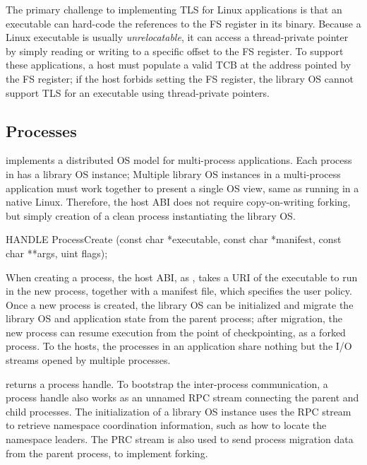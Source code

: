 The primary challenge
to implementing TLS for Linux applications
is that an executable can hard-code the references to the FS register in its binary.
Because a Linux executable is usually {\em unrelocatable},
it can access a thread-private pointer by simply reading or writing to a specific offset
to the FS register.
To support these applications,
a host must populate a valid TCB at the address pointed by the FS register;
if the host forbids setting the FS register,
the library OS cannot support TLS for an executable using thread-private pointers.




\subsection{Processes}
\label{sec:abi:proc}


\graphene{} implements a distributed OS model for multi-process applications.
Each process in \graphene{} has a library OS instance;
Multiple library OS instances in a multi-process application must work together
to present a single OS view,
same as running in a native Linux.
Therefore, the host ABI does not require copy-on-writing forking,
but simply creation of a clean process instantiating the library OS.




\begin{paldef}
HANDLE ProcessCreate (const char *executable,
                      const char *manifest,
                      const char **args, uint flags);
\end{paldef}

When creating a process, the host ABI, as , takes a URI of the executable to run in the new process,
together with a manifest file, which specifies the user policy.
Once a new process is created, the library OS can be initialized
and migrate the library OS and application state from the parent process;
after migration, the new process can resume execution from the point of checkpointing,
as a forked process.
To the hosts, the processes in an application share nothing
but the I/O streams opened by multiple processes.


 returns a process handle.
To bootstrap the inter-process communication, a process handle also works as an unnamed RPC stream connecting the parent and child processes.
The initialization of a library OS instance uses the RPC stream
to retrieve namespace coordination information, such as how to locate the namespace leaders.
The PRC stream is also used to send process migration data
from the parent process, to implement forking.






